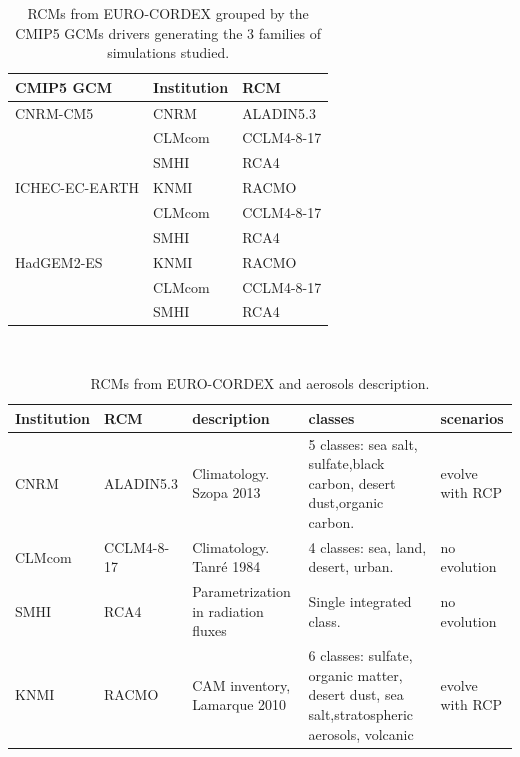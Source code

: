 \begin{table}
\caption{\label{tb:families}RCMs from EURO-CORDEX grouped by the CMIP5 GCMs drivers generating the 3 families of simulations studied.}
\footnotesize
\begin{tabular}{>{\raggedrigth}m{3cm}>{\raggedright}m{3cm}>{\raggedright}m{3cm}}
\toprule 
CMIP5 GCM & Institution  & RCM  \tabularnewline
\midrule
 CNRM-CM5 & CNRM & ALADIN5.3 \tabularnewline
&CLMcom&CCLM4-8-17\tabularnewline 
&SMHI&RCA4\tabularnewline
\midrule  
ICHEC-EC-EARTH&KNMI&RACMO\tabularnewline
&CLMcom&CCLM4-8-17\tabularnewline
&SMHI&RCA4\tabularnewline
\midrule  
HadGEM2-ES&KNMI&RACMO\tabularnewline
&CLMcom&CCLM4-8-17\tabularnewline
&SMHI&RCA4\tabularnewline  
\bottomrule
\end{tabular}\\
\end{table}
\normalsize

\begin{table}
\caption{\label{tb:families}RCMs from EURO-CORDEX and aerosols description.}
\footnotesize
\begin{tabular}{>{\raggedrigth}m{1.3cm}>{\raggedright}m{1.3cm}|>{\raggedright}m{2.2cm}>{\raggedright}m{2.2cm}>{\raggedright}m{2cm}}
\toprule 
Institution  & RCM & description & classes & scenarios \tabularnewline
\midrule
CNRM & ALADIN5.3 & Climatology. Szopa 2013 & 5 classes: sea salt, sulfate,black carbon, desert dust,organic carbon.& evolve with RCP \tabularnewline
CLMcom&CCLM4-8-17& Climatology. Tanré 1984 & 4 classes: sea, land, desert, urban.& no evolution\tabularnewline 
SMHI&RCA4& Parametrization in radiation fluxes & Single integrated class.& no evolution \tabularnewline
KNMI&RACMO&CAM inventory, Lamarque 2010 & 6 classes: sulfate, organic matter, desert dust, sea salt,stratospheric aerosols, volcanic & evolve with RCP\tabularnewline
\bottomrule
\end{tabular}\\
\end{table}
\normalsize



